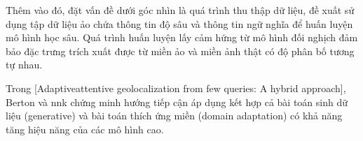 Thêm vào đó, đặt vấn đề dưới góc nhìn là quá trình thu thập dữ liệu, \cite{hu2020dasgil} đề xuất sử dụng tập dữ liệu ảo chứa thông tin độ sâu và thông tin ngữ nghĩa để huấn luyện mô hình học sâu. Quá trình huấn luyện lấy cảm hứng từ mô hình đối nghịch đảm bảo đặc trưng trích xuất được từ miền ảo và miền ảnh thật có độ phân bố tương tự nhau.

Trong [Adaptiveattentive geolocalization from few queries: A hybrid approach], Berton và nnk chứng minh hướng tiếp cận áp dụng kết hợp cả bài toán sinh dữ liệu (generative) và bài toán thích ứng miền (domain adaptation) có khả năng tăng hiệu năng của các mô hình cao.
